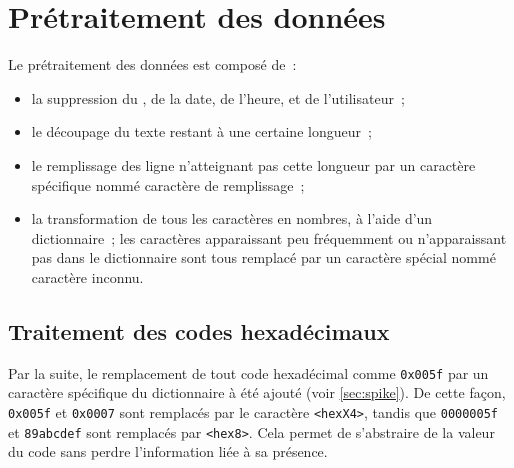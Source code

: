\section{Prétraitement des données}\label{def_dict_papud}
Le prétraitement des données est composé de~:
\begin{itemize}
	\item la suppression du , de la date, de l'heure, et de l'utilisateur~;
	\item le découpage du texte restant à une certaine longueur~;
	\item le remplissage des ligne n'atteignant pas cette longueur par un caractère spécifique nommé caractère de remplissage~;
	\item la transformation de tous les caractères en nombres, à l'aide d'un dictionnaire~; les caractères apparaissant peu fréquemment ou n'apparaissant pas dans le dictionnaire sont tous remplacé par un caractère spécial nommé \og caractère inconnu\fg{}.
\end{itemize}

\subsection{Traitement des codes hexadécimaux}\label{hex}
Par la suite, le remplacement de tout code hexadécimal comme \lstinline|0x005f| par un caractère spécifique du dictionnaire à été ajouté (voir \autoref{sec:spike}).
De cette façon, \lstinline|0x005f| et \lstinline|0x0007| sont remplacés par le caractère  \lstinline|<hexX4>|, tandis que  \lstinline|0000005f| et  \lstinline|89abcdef| sont remplacés par  \lstinline|<hex8>|.
Cela permet de s'abstraire de la valeur du code sans perdre l'information liée à sa présence.

